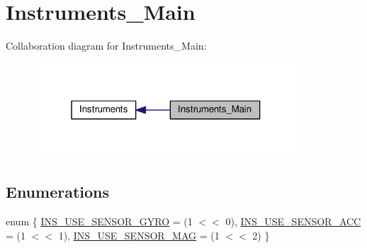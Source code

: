 \hypertarget{group__Instruments__Main}{\section{Instruments\+\_\+\+Main}
\label{group__Instruments__Main}
}
Collaboration diagram for Instruments\+\_\+\+Main\+:\nopagebreak
\begin{figure}[H]
\begin{center}
\leavevmode
\includegraphics[width=280pt]{group__Instruments__Main}
\end{center}
\end{figure}
\subsection*{Enumerations}
\begin{DoxyCompactItemize}
\item 
enum \{ \hyperlink{group__Instruments__Main_gga94798fdadfbf49a7c658ace669a1d310a84c831c31d7f2a8e2023ca769f6732af}{I\+N\+S\+\_\+\+U\+S\+E\+\_\+\+S\+E\+N\+S\+O\+R\+\_\+\+G\+Y\+R\+O} = (1 $<$$<$ 0), 
\hyperlink{group__Instruments__Main_gga94798fdadfbf49a7c658ace669a1d310ae8a4c4e97a3c558da476d0574d24939d}{I\+N\+S\+\_\+\+U\+S\+E\+\_\+\+S\+E\+N\+S\+O\+R\+\_\+\+A\+C\+C} = (1 $<$$<$ 1), 
\hyperlink{group__Instruments__Main_gga94798fdadfbf49a7c658ace669a1d310a2695c458b15adb459d132fc4240062e4}{I\+N\+S\+\_\+\+U\+S\+E\+\_\+\+S\+E\+N\+S\+O\+R\+\_\+\+M\+A\+G} = (1 $<$$<$ 2)
 \}
\end{DoxyCompactItemize}
